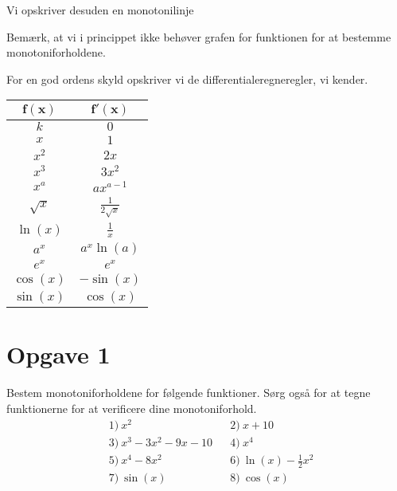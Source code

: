 \begin{exa}
Vi opskriver desuden en monotonilinje
\begin{center}
\end{center}
Bemærk, at vi i princippet ikke behøver grafen for funktionen for at bestemme monotoniforholdene. 
\end{exa}

For en god ordens skyld opskriver vi de differentialeregneregler, vi kender.

\begin{center}
	\begin{tabular}{c|c}
		$\boldsymbol{f(x)}$ & $\boldsymbol{f'(x)}$\\
		\hline
		$k$ & $0$\\
		\hline
		$x$ & $1$\\
		\hline 
		$x^2$ & $2x$\\
		\hline
		$x^3$ & $3x^2$\\
		\hline
		$x^a$ & $ax^{a-1}$\\
		\hline 
		$\sqrt{x}$ & $\frac{1}{2\sqrt{x}}$ \\
		\hline
		$\ln(x)$ & $\frac{1}{x}$\\
		\hline
		$a^x$ & $a^x\ln(a)$\\
		\hline 
		$e^x$ & $e^x$\\
		\hline 
		$\cos(x)$ & $-\sin(x)$\\
		\hline
		$\sin(x)$ & $\cos(x)$
	\end{tabular}
\end{center}
\section*{Opgave 1}
Bestem monotoniforholdene for følgende funktioner. Sørg også for at tegne funktionerne for at verificere dine monotoniforhold. 
\begin{align*}
&1) \ x^2   &&2)\ x+10  \\
&3) \ x^3 - 3x^2 - 9x -10 &&4)\ x^4 \\
&5) \ x^4-8x^2 &&6)\ \ln(x) -\frac{1}{2}x^2 \\
&7) \ \sin(x)  &&8)\ \cos(x)  
\end{align*}